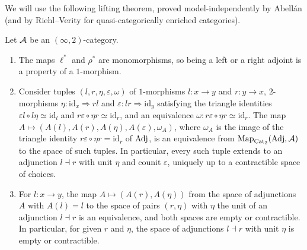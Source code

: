 %
We will use the following lifting theorem, proved model-independently by
Abell\'an (and by Riehl--Verity
\cite[Thms.~4.3.11, 4.4.18]{riehlverity2016adjunctions} for
quasi-categorically enriched categories).

\begin{thm}
\label{thm:adj-lifting}
%
Let $\mathcal{A}$ be an $(\infty,2)$-category.
\begin{enumerate}
\item The maps $\ell^{*}$ and $\rho^{*}$ are monomorphisms, so being a left or a
right adjoint is a property of a $1$-morphism.
\item Consider tuples
$(l,r,\eta,\varepsilon,\omega)$
of $1$-morphisms
$l\colon x \to y$
and
$r\colon y \to x$,
$2$-morphisms
$\eta\colon \mathrm{id}_{x} \Rightarrow rl$
and
$\varepsilon\colon lr \Rightarrow \mathrm{id}_{y}$
satisfying the triangle identities
$\varepsilon l \circ l\eta \simeq \mathrm{id}_{l}$
and
$r\varepsilon \circ \eta r \simeq \mathrm{id}_{r}$,
and an equivalence
$\omega\colon r\varepsilon \circ \eta r \simeq \mathrm{id}_{r}$.
The map
$A \mapsto (A(l),A(r),A(\eta),A(\varepsilon),\omega_{A})$,
where $\omega_{A}$ is the image of the triangle identity
$r\varepsilon \circ \eta r = \mathrm{id}_{r}$
of $\mathrm{Adj}$, is an equivalence from
$\operatorname{Map}_{\mathrm{Cat}_{2}}(\mathrm{Adj},\mathcal{A})$
to the space of such tuples. In particular, every such tuple extends to an
adjunction $l \dashv r$ with unit $\eta$ and counit $\varepsilon$, uniquely up
to a contractible space of choices.
\item For
$l\colon x \to y$,
the map
$A \mapsto (A(r),A(\eta))$
from the space of adjunctions $A$ with $A(l) = l$ to the space of pairs
$(r,\eta)$ with $\eta$ the unit of an adjunction $l \dashv r$ is an
equivalence, and both spaces are empty or contractible. In particular, for
given $r$ and $\eta$, the space of adjunctions $l \dashv r$ with unit $\eta$ is
empty or contractible.
\end{enumerate}
\end{thm}

